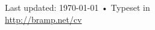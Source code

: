 \documentclass[a4paper,10pt]{article}
\begin{document}


\newpage
\renewcommand\refname{Publications}


\vfill{}

\begin{center}
{\scriptsize  Last updated: \today\- •\- 
Typeset in \XeLaTeX\\
\href{http://bramp.net/cv}{http://bramp.net/cv}}
\end{center}
\end{document}
